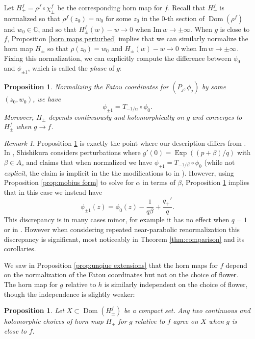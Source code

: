 \documentclass[12pt,letterpaper]{amsart}
\numberwithin{equation}{section}
\newtheorem{prop}[equation]{Proposition}
\theoremstyle{remark}
\newtheorem{rem}[equation]{Remark}
\theoremstyle{definition}
\newcommand{\C}{\mathbb C}
\DeclareMathOperator{\Dom}{Dom}
\DeclareMathOperator{\Exp}{Exp}
\begin{document}
	Let $H_\pm^f = \rho^f\circ \chi_\pm^f$ be the corresponding horn map for $f$.
	Recall that $H_\pm^f$ is normalized so that $\rho^f(z_0)=w_0$ for some $z_0$ in the $0$-th section of $\Dom(\rho^f)$ and $w_0\in \C$, and so that $H_\pm^f(w)-w\to 0$ when $\text{Im}\,w\to \pm \infty$. 
	When $g$ is close to $f$, Proposition \ref{horn maps perturbed} implies that we can similarly normalize the horn map $H_\pm$ so that $\rho(z_0)= w_0$ and $H_\pm(w)-w\to 0$ when $\text{Im}\,w\to \pm \infty$. 
	Fixing this normalization, we can explicitly compute the difference between $\phi_0$ and $\phi_{\pm 1}$, which is called the \textit{phase} of $g$:
	\begin{prop}\label{prop:phase}
		Normalizing the Fatou coordinates for $(P_j, \phi_j)$ by some $(z_0, w_0)$, we have
		$$\phi_{\pm 1}= T_{-1/\alpha}\circ \phi_0.$$
		Moreover, $H_\pm$ depends continuously and holomorphically on $g$ and converges to $H_\pm^f$ when $g\to f$.
	\end{prop} 
	
	\begin{rem}\label{rem:error}
		Proposition \ref{prop:phase} is exactly the point where our description differs from  \cite{shishikura_boundary}. In \cite{shishikura_boundary}, Shishikura considers perturbations where $g'(0) = \Exp((p+\beta)/ q)$ with $\beta\in A_{s}$ and claims that when normalized we have $\phi_{\pm 1}= T_{-1/\beta}\circ \phi_0$ (while not  \textit{explicit}, the claim is implicit in the the modifications to \cite[(4.2.4)]{shishikura_boundary} in \cite[\S 7]{shishikura_boundary}). However, using Proposition \ref{prop:mobius form} to solve for $\alpha$ in terms of $\beta$, Proposition  \ref{prop:phase} implies that in this case  we instead have
		$$\phi_{\pm 1}(z) = \phi_0(z)-\frac{1}{q\beta}+\frac{q_+'}{q}.$$
		This discrepancy  is in many cases minor, for example it  has no effect when $q= 1$ or in \cite{shishikura_boundary}. However when considering repeated near-parabolic renormalization this discrepancy is significant,  most noticeably in Theorem \ref{thm:comparison} and its corollaries.
	\end{rem}
	

	We saw in Proposition \ref{prop:unqiue extensions} that the horn maps for $f$ depend on the normalization of the Fatou coordinates but not on the choice of flower.  
	The horn map for $g$ relative to $h$ is similarly independent on the choice of flower, though the independence is slightly weaker:
	
	\begin{prop}
		Let $X\subset \Dom(H_\pm^f)$ be a compact set. Any two continuous and holomorphic choices of horn map $H_\pm$ for $g$ relative to $f$ agree on $X$ when $g$ is close to $f$.
	\end{prop}
	
\end{document}
